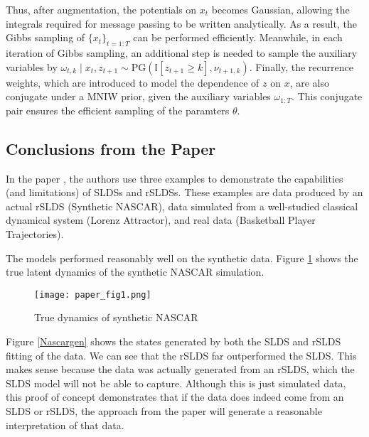 Thus, after augmentation, the potentials on $x_{t}$ becomes Gaussian, allowing the integrals required for message passing to be written analytically. As a result, the Gibbs sampling of $\{x_t\}_{t=1:T}$ can be performed efficiently. Meanwhile, in each iteration of Gibbs sampling, an additional step is needed to sample the auxiliary variables by $\omega_{t, k} \mid x_{t}, z_{t+1} \sim \mathrm{PG}\left(\mathbb{I}\left[z_{t+1} \geq k\right], \nu_{t+1, k}\right)$. Finally, the recurrence weights, which are introduced to model the dependence of $z$ on $x$, are also conjugate under a MNIW prior, given the auxiliary variables $\omega_{1: T}$. This conjugate pair ensures the efficient sampling of the paramters $\theta$.



\subsection{Conclusions from the Paper}

In the paper \cite{linderman_bayesian_2017}, the authors use three examples to demonstrate the capabilities (and limitations) of SLDSs and rSLDSs. These examples are data produced by an actual rSLDS (Synthetic NASCAR), data simulated from a well-studied classical dynamical system (Lorenz Attractor), and real data (Basketball Player Trajectories).

The models performed reasonably well on the synthetic data. Figure \ref{trueNascar} shows the true latent dynamics of the synthetic NASCAR simulation.
\begin{figure}[h!]
	\centering
	\texttt{[image: paper\_fig1.png]}
	\caption{True dynamics of synthetic NASCAR}
	\label{trueNascar}
\end{figure}

Figure \ref{Nascargen} shows the states generated by both the SLDS and rSLDS fitting of the data. We can see that the rSLDS far outperformed the SLDS. This makes sense because the data was actually generated from an rSLDS, which the SLDS model will not be able to capture. Although this is just simulated data, this proof of concept demonstrates that if the data does indeed come from an SLDS or rSLDS, the approach from the paper will generate a reasonable interpretation of that data.

